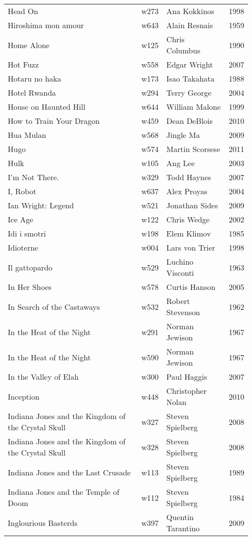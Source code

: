 \documentclass{article}
\begin{document}
\begin {center}
\begin{longtable}{p{10cm} l l l}
Head On & w273 & Ana Kokkinos & 1998 \\
Hiroshima mon amour & w643 & Alain Resnais & 1959 \\
Home Alone & w125 & Chris Columbus & 1990 \\
Hot Fuzz & w558 & Edgar Wright & 2007 \\
Hotaru no haka & w173 & Isao Takahata & 1988 \\
Hotel Rwanda & w294 & Terry George & 2004 \\
House on Haunted Hill & w644 & William Malone & 1999 \\
How to Train Your Dragon & w459 & Dean DeBlois & 2010 \\
Hua Mulan & w568 & Jingle Ma & 2009 \\
Hugo & w574 & Martin Scorsese & 2011 \\
Hulk & w105 & Ang Lee & 2003 \\
I'm Not There. & w329 & Todd Haynes & 2007 \\
I, Robot & w637 & Alex Proyas & 2004 \\
Ian Wright: Legend & w521 & Jonathan Sides & 2009 \\
Ice Age & w122 & Chris Wedge & 2002 \\
Idi i smotri & w198 & Elem Klimov & 1985 \\
Idioterne & w004 & Lars von Trier & 1998 \\
Il gattopardo & w529 & Luchino Visconti & 1963 \\
In Her Shoes & w578 & Curtis Hanson & 2005 \\
In Search of the Castaways & w532 & Robert Stevenson & 1962 \\
In the Heat of the Night & w291 & Norman Jewison & 1967 \\
In the Heat of the Night & w590 & Norman Jewison & 1967 \\
In the Valley of Elah & w300 & Paul Haggis & 2007 \\
Inception & w448 & Christopher Nolan & 2010 \\
Indiana Jones and the Kingdom of the Crystal Skull & w327 & Steven Spielberg & 2008 \\
Indiana Jones and the Kingdom of the Crystal Skull & w328 & Steven Spielberg & 2008 \\
Indiana Jones and the Last Crusade & w113 & Steven Spielberg & 1989 \\
Indiana Jones and the Temple of Doom & w112 & Steven Spielberg & 1984 \\
Inglourious Basterds & w397 & Quentin Tarantino & 2009 \\

\end{longtable}
\end{center}
\end{document}
